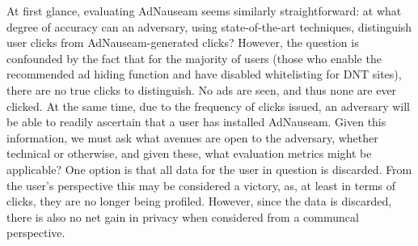 \documentclass[conference]{IEEEtran}
\begin{document}
At first glance, evaluating AdNauseam seems similarly straightforward: at what degree of accuracy can an adversary, using state-of-the-art techniques, distinguish user clicks from AdNauseam-generated clicks? However, the question is confounded by the fact that for the majority of users (those who enable the recommended ad hiding function and have disabled whitelisting for DNT sites), there are no true clicks to distinguish. No ads are seen, and thus none are ever clicked. At the same time, due to the frequency of clicks issued, an adversary will be able to readily ascertain that a user has installed AdNauseam. Given this information, we must ask what avenues are open to the adversary, whether technical or otherwise, and given these, what evaluation metrics might be applicable? One option is that all data for the user in question is discarded. From the user's perspective this may be considered a victory, as, at least in terms of clicks, they are no longer being profiled. However, since the data is discarded, there is also no net gain in privacy when considered from a communcal perspective.
\end{document}
